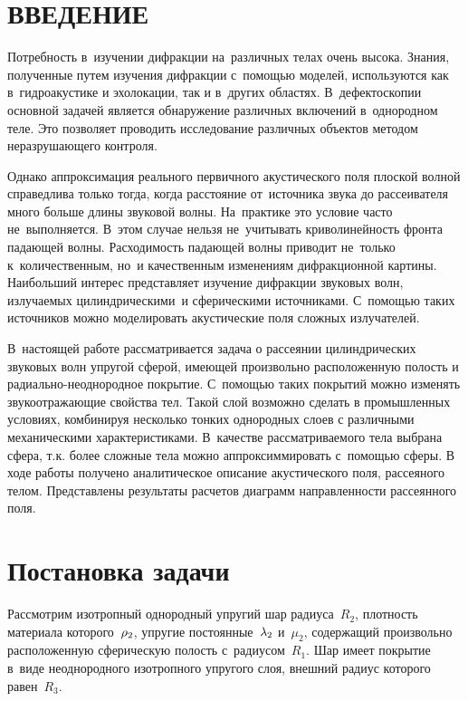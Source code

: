 

\renewcommand{\bibname}{СПИСОК ИСПОЛЬЗОВАННЫХ ИСТОЧНИКОВ}
\renewcommand\refname{СПИСОК ИСПОЛЬЗОВАННЫХ ИСТОЧНИКОВ}

%

\setcounter{page}{2}
\thispagestyle {empty}
\renewcommand{\contentsname}{\centering СОДЕРЖАНИЕ}
\tableofcontents

\newpage
\section*{ВВЕДЕНИЕ}
Потребность в~изучении дифракции на~различных телах очень высока. Знания, полученные путем изучения дифракции с~помощью моделей, используются как в~гидроакустике и эхолокации, так и в~других областях. В~дефектоскопии основной задачей является обнаружение различных включений в~однородном теле. Это позволяет проводить исследование различных объектов методом неразрушающего контроля.

Однако аппроксимация реального первичного акустического поля
плоской волной справедлива только тогда, когда расстояние от~источника звука до рассеивателя много больше длины звуковой волны. На~практике это условие часто не~выполняется. В~этом случае нельзя не~учитывать криволинейность фронта падающей волны. Расходимость падающей волны приводит не~только к~количественным, но~и качественным
изменениям дифракционной картины. Наибольший интерес представляет изучение дифракции звуковых волн, излучаемых цилиндрическими~и
сферическими источниками. С~помощью таких источников можно моделировать акустические поля сложных излучателей.


В~настоящей работе рассматривается задача о рассеянии цилиндрических звуковых волн упругой сферой, имеющей произвольно расположенную полость и радиально-неоднородное покрытие. С~помощью таких покрытий можно изменять звукоотражающие свойства тел. Такой слой возможно сделать в промышленных условиях, комбинируя несколько тонких однородных слоев с различными механическими характеристиками. В~качестве рассматриваемого тела выбрана сфера, т.к. более сложные тела можно аппроксиммировать с~помощью сферы. В ходе работы получено аналитическое описание акустического поля, рассеяного телом. Представлены результаты расчетов диаграмм направленности рассеянного поля.


\newpage
\section{Постановка задачи} Рассмотрим изотропный однородный упругий шар радиуса~$R_2$, плотность материала которого~$\rho_2$, упругие постоянные~$\lambda_2$ и~$\mu_2$, содержащий произвольно расположенную сферическую полость с~радиусом~$R_1$. Шар имеет покрытие в~виде неоднородного изотропного упругого слоя, внешний радиус которого равен~$R_3$.
 
